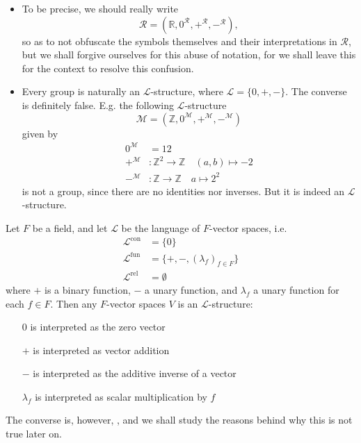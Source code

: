 \documentclass[notoc,notitlepage]{tufte-book}
\DeclareMathOperator{\con}{con}
\DeclareMathOperator{\fun}{fun}
\DeclareMathOperator{\rel}{rel}
\begin{document}
\begin{remark}
  \begin{itemize}
    \item To be precise, we should really write
      \begin{equation*}
        \mathcal{R} = (\mathbb{R}, 0^\mathcal{R}, +^\mathcal{R}, -^\mathcal{R}),
      \end{equation*}
      so as to not obfuscate the symbols themselves and their interpretations in $\mathcal{R}$, but we shall forgive ourselves for this abuse of notation, for we shall leave this for the context to resolve this confusion.

    \item Every group is naturally an $\mathcal{L}$-structure, where $\mathcal{L} = \{ 0, +, - \}$. The converse is definitely false. E.g. the following $\mathcal{L}$-structure
      \begin{equation*}
        \mathcal{M} = ( \mathbb{Z}, 0^\mathcal{M}, +^\mathcal{M}, -^\mathcal{M} )
      \end{equation*}
      given by
      \begin{align*}
        0^\mathcal{M} &= 12 \\
        +^\mathcal{M} &: \mathbb{Z}^2 \to \mathbb{Z} \quad (a, b) \mapsto -2 \\
        -^\mathcal{M} &: \mathbb{Z} \to \mathbb{Z} \quad a \mapsto 2^2
      \end{align*}
      is not a group, since there are no identities nor inverses. But it is indeed an $\mathcal{L}$-structure.
  \end{itemize}
\end{remark}

\begin{eg}
  Let $F$ be a field, and let $\mathcal{L}$ be the language of $F$-vector spaces, i.e.
  \begin{align*}
    \mathcal{L}^{\con} &= \{ 0 \} \\
    \mathcal{L}^{\fun} &= \{ +, -, (\lambda_f)_{f \in F} \} \\
    \mathcal{L}^{\rel} &= \emptyset
  \end{align*}
  where $+$ is a binary function, $-$ a unary function, and $\lambda_f$ a unary function for each $f \in F$. Then any $F$-vector spaces $V$ is an $\mathcal{L}$-structure:
  \begin{itemize}[leftmargin=2.0cm,labelsep=0.5cm]
    \item[$0$] is interpreted as the zero vector
    \item[$+$] is interpreted as vector addition
    \item[$-$] is interpreted as the additive inverse of a vector
    \item[$\lambda_f$] is interpreted as scalar multiplication by $f$
  \end{itemize}
  The converse is, however, , and we shall study the reasons behind why this is not true later on.
\end{eg}
\end{document}
